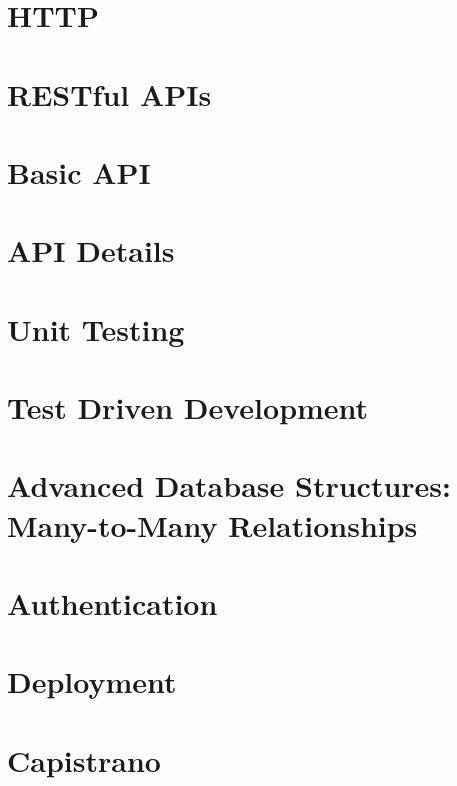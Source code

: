 \documentclass[b5paper,openany]{book}
\begin{document}
\tp


\tableofcontents



\chapter{HTTP}


\chapter{RESTful APIs}


\chapter{Basic API}


\chapter{API Details}


\chapter{Unit Testing}


\chapter{Test Driven Development}


\chapter{Advanced Database Structures: Many-to-Many Relationships}


\chapter{Authentication}


\chapter{Deployment}


\chapter{Capistrano}






\end{document}
